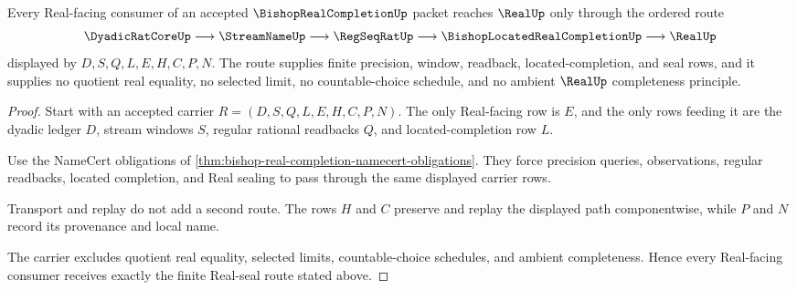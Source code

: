 \begin{theorem}
\label{thm:bishop-real-completion-real-seal-route}
Every Real-facing consumer of an accepted $\BishopRealCompletionUp$ packet reaches $\RealUp$ only through the ordered route
$$
\DyadicRatCoreUp \longrightarrow \StreamNameUp \longrightarrow \RegSeqRatUp \longrightarrow \BishopLocatedRealCompletionUp \longrightarrow \RealUp
$$
displayed by $D,S,Q,L,E,H,C,P,N$. The route supplies finite precision, window, readback, located-completion, and seal rows, and it supplies no quotient real equality, no selected limit, no countable-choice schedule, and no ambient $\RealUp$ completeness principle.
\end{theorem}
\begin{proof}
Start with an accepted carrier $R=(D,S,Q,L,E,H,C,P,N)$. The only Real-facing row is $E$, and the only rows feeding it are the dyadic ledger $D$, stream windows $S$, regular rational readbacks $Q$, and located-completion row $L$.

Use the NameCert obligations of \autoref{thm:bishop-real-completion-namecert-obligations}. They force precision queries, observations, regular readbacks, located completion, and Real sealing to pass through the same displayed carrier rows.

Transport and replay do not add a second route. The rows $H$ and $C$ preserve and replay the displayed path componentwise, while $P$ and $N$ record its provenance and local name.

The carrier excludes quotient real equality, selected limits, countable-choice schedules, and ambient completeness. Hence every Real-facing consumer receives exactly the finite Real-seal route stated above.
\end{proof}

